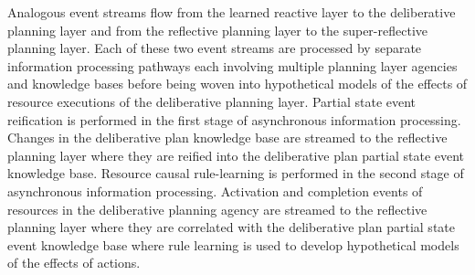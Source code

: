 Analogous event streams flow from the learned reactive layer to the
deliberative planning layer and from the reflective planning layer to
the super-reflective planning layer.  Each of these two event streams
are processed by separate information processing pathways each
involving multiple planning layer agencies and knowledge bases before
being woven into hypothetical models of the effects of resource
executions of the deliberative planning layer.  Partial state event
reification is performed in the first stage of asynchronous
information processing.  Changes in the deliberative plan knowledge
base are streamed to the reflective planning layer where they are
reified into the deliberative plan partial state event knowledge base.
Resource causal rule-learning is performed in the second stage of
asynchronous information processing.  Activation and completion events
of resources in the deliberative planning agency are streamed to the
reflective planning layer where they are correlated with the
deliberative plan partial state event knowledge base where rule
learning is used to develop hypothetical models of the effects of
actions.

